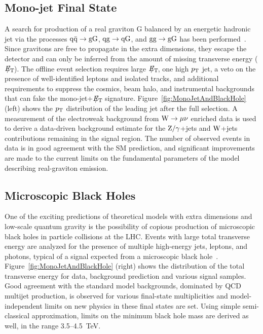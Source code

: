\documentclass[11pt]{article}
\def\etmiss {\ensuremath{E_{\mathrm{T}}\hspace{-1.1em}/\kern0.5em}\xspace}
\def\pt{\ensuremath{p_{\rm T}}\xspace}
\def\zjets{\ensuremath{\rm{Z}/\gamma}+jets\xspace}
\def\wjets{\ensuremath{\rm{W}}+jets\xspace}
\begin{document}
\subsection{Mono-jet Final State}
A search for production of a real graviton G 
balanced by an energetic hadronic jet via the processes 
$\rm{q}\bar{\rm{q}} \rightarrow \rm{gG}$, $\rm{q}\rm{g} \rightarrow \rm{qG}$, 
and $\rm{g}\rm{g} \rightarrow \rm{gG}$ has been performed~\cite{CMSPAPER:EXO-11-003}. 
Since gravitons are free to propagate in the extra dimensions, they escape 
the detector and can only be inferred from the amount of missing transverse energy (\etmiss). 
The offline event selection requires large \etmiss, one high \pt jet, a veto on the 
presence of well-identified leptons and isolated tracks, and additional 
requirements to suppress the cosmics, beam halo, and instrumental backgrounds 
that can fake the mono-jet+\etmiss signature. 
Figure~\ref{fig:MonoJetAndBlackHole} (left) shows the \pt distribution of the leading jet after the full selection. 
A measurement of the electroweak background from $\rm{W} \rightarrow \mu\nu$ enriched 
data is used to derive a data-driven background estimate for the \zjets and \wjets contributions 
remaining in the signal region. The number of observed events in data is in 
good agreement with the SM prediction, 
and significant improvements are made to the current limits on the fundamental parameters of 
the model describing real-graviton emission.

\subsection{Microscopic Black Holes}
One of the exciting predictions of theoretical models with extra dimensions 
and low-scale quantum gravity is the possibility of copious production of microscopic black 
holes in particle collisions at the LHC.
Events with large total transverse energy are analyzed for the presence
of multiple high-energy jets, leptons, and photons, typical of a signal expected from a microscopic black 
hole~\cite{Khachatryan2011434}. 
Figure~\ref{fig:MonoJetAndBlackHole} (right) shows the distribution of the total transverse energy for data, 
background prediction and various signal samples. Good agreement with the standard model backgrounds, 
dominated by QCD multijet production, is observed for various final-state multiplicities 
and model-independent limits on new physics in these final states are set. 
Using simple semi-classical approximation, limits on the minimum black hole 
mass are derived as well, in the range 3.5--4.5~TeV.
\end{document}
